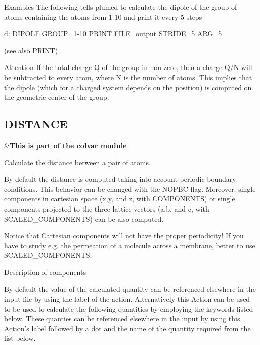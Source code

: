 \begin{DoxyParagraph}{Examples}
The following tells plumed to calculate the dipole of the group of atoms containing the atoms from 1-\/10 and print it every 5 steps \begin{DoxyVerb}d: DIPOLE GROUP=1-10
PRINT FILE=output STRIDE=5 ARG=5
\end{DoxyVerb}
 (see also \hyperlink{PRINT}{P\+R\+I\+N\+T})
\end{DoxyParagraph}
\begin{DoxyAttention}{Attention}
If the total charge Q of the group in non zero, then a charge Q/\+N will be subtracted to every atom, where N is the number of atoms. This implies that the dipole (which for a charged system depends on the position) is computed on the geometric center of the group. 
\end{DoxyAttention}
\hypertarget{DISTANCE}{}\subsection{D\+I\+S\+T\+A\+N\+C\+E}\label{DISTANCE}
\begin{TabularC}{2}
\hline
&{\bfseries  This is part of the colvar \hyperlink{mymodules}{module }}   \\
\end{TabularC}
Calculate the distance between a pair of atoms.

By default the distance is computed taking into account periodic boundary conditions. This behavior can be changed with the N\+O\+P\+B\+C flag. Moreover, single components in cartesian space (x,y, and z, with C\+O\+M\+P\+O\+N\+E\+N\+T\+S) or single components projected to the three lattice vectors (a,b, and c, with S\+C\+A\+L\+E\+D\+\_\+\+C\+O\+M\+P\+O\+N\+E\+N\+T\+S) can be also computed.

Notice that Cartesian components will not have the proper periodicity! If you have to study e.\+g. the permeation of a molecule across a membrane, better to use S\+C\+A\+L\+E\+D\+\_\+\+C\+O\+M\+P\+O\+N\+E\+N\+T\+S.

\begin{DoxyParagraph}{Description of components}

\end{DoxyParagraph}
By default the value of the calculated quantity can be referenced elsewhere in the input file by using the label of the action. Alternatively this Action can be used to be used to calculate the following quantities by employing the keywords listed below. These quanties can be referenced elsewhere in the input by using this Action's label followed by a dot and the name of the quantity required from the list below.

